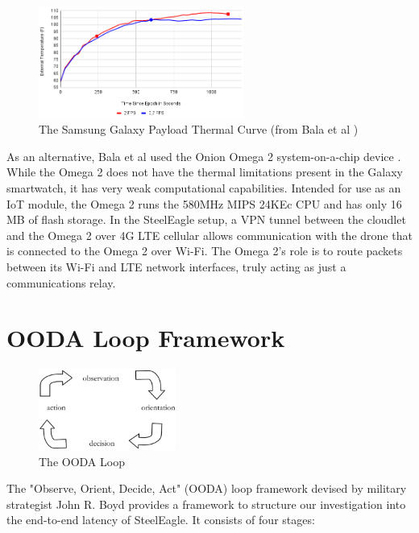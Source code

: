 \begin{figure}[htbp]
\centering
\includegraphics[width=0.6\textwidth]{sec2023-figs/fig-thermal-curve.png}
\caption{The Samsung Galaxy Payload Thermal Curve (from Bala et al \cite{bala2024})}
\label{fig:watch-themal-curve}
\end{figure}

As an alternative, Bala et al used the Onion Omega 2 system-on-a-chip device
\cite{onionomega2}. While the Omega 2 does not have the thermal limitations
present in the Galaxy smartwatch, it has very weak computational capabilities.
Intended for use as an IoT module, the Omega 2 runs the 580MHz MIPS 24KEc CPU
and has only 16 MB of flash storage. In the SteelEagle setup, a VPN tunnel
between the cloudlet and the Omega 2 over 4G LTE cellular allows communication
with the drone that is connected to the Omega 2 over Wi-Fi. The Omega 2's role
is to route packets between its Wi-Fi and LTE network interfaces, truly acting
as just a communications relay.

\section{OODA Loop Framework}
\label{sec:ooda-loop}

\begin{figure}[htbp]
\centering
\includegraphics[width=0.4\textwidth]{figs/ooda-loop.png}
\caption{The OODA Loop}
\label{fig:ooda-loop}
\end{figure}

The "Observe, Orient, Decide, Act" (OODA) loop framework devised by military
strategist John R. Boyd provides a framework to structure our investigation
into the end-to-end latency of SteelEagle. It consists of four stages:

